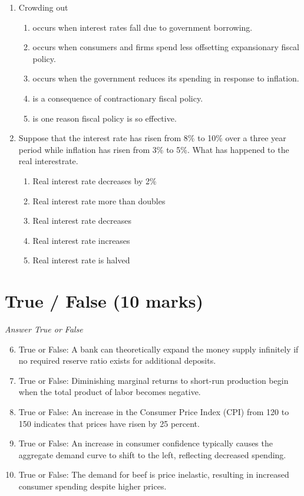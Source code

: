 \documentclass[12pt]{article}
\begin{document}
\begin{enumerate}[label=\arabic*.]
\begin{enumerate}[label=(\alph*)]
    \item Central banks have less control over interest rates
\end{enumerate}
\item Crowding out
\begin{enumerate}[label=(\alph*)]
    \item occurs when interest rates fall due to government borrowing.
    \item occurs when consumers and firms spend less offsetting expansionary fiscal policy.
    \item occurs when the government reduces its spending in response to inflation.
    \item is a consequence of contractionary fiscal policy.
    \item is one reason fiscal policy is so effective.
\end{enumerate}
\item Suppose that the interest rate has risen from 8\% to 10\% over a three year period while inflation has risen from 3\% to 5\%. What has happened to the real interestrate.
\begin{enumerate}[label=(\alph*)]
    \item Real interest rate decreases by 2\%
    \item Real interest rate more than doubles
    \item Real interest rate decreases
    \item Real interest rate increases
    \item Real interest rate is halved
\end{enumerate}
\end{enumerate}

\section*{True / False (10 marks)}
\textit{Answer True or False}
\begin{enumerate}[label=\arabic*.]
\setcounter{enumi}{5}
\item True or False: A bank can theoretically expand the money supply infinitely if no required reserve ratio exists for additional deposits.
\item True or False: Diminishing marginal returns to short-run production begin when the total product of labor becomes negative.
\item True or False: An increase in the Consumer Price Index (CPI) from 120 to 150 indicates that prices have risen by 25 percent.
\item True or False: An increase in consumer confidence typically causes the aggregate demand curve to shift to the left, reflecting decreased spending.
\item True or False: The demand for beef is price inelastic, resulting in increased consumer spending despite higher prices.
\end{enumerate}
\end{document}
